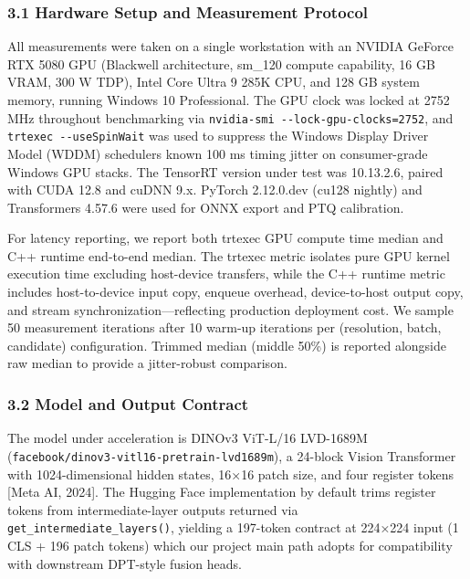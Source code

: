 \documentclass[
]{article}
\begin{document}
\subsubsection{3.1 Hardware Setup and Measurement
Protocol}\label{31-hardware-setup-and-measurement-protocol}

All measurements were taken on a single workstation with an NVIDIA
GeForce RTX 5080 GPU (Blackwell architecture, sm\_120 compute
capability, 16 GB VRAM, 300 W TDP), Intel Core Ultra 9 285K CPU, and 128
GB system memory, running Windows 10 Professional. The GPU clock was
locked at 2752 MHz throughout benchmarking via
\texttt{nvidia-smi\ -\/-lock-gpu-clocks=2752}, and
\texttt{trtexec\ -\/-useSpinWait} was used to suppress the Windows
Display Driver Model (WDDM) scheduler\textquotesingle s known 100 ms
timing jitter on consumer-grade Windows GPU stacks. The TensorRT version
under test was 10.13.2.6, paired with CUDA 12.8 and cuDNN 9.x. PyTorch
2.12.0.dev (cu128 nightly) and Transformers 4.57.6 were used for ONNX
export and PTQ calibration.

For latency reporting, we report both trtexec GPU compute time median
and C++ runtime end-to-end median. The trtexec metric isolates pure GPU
kernel execution time excluding host-device transfers, while the C++
runtime metric includes host-to-device input copy, enqueue overhead,
device-to-host output copy, and stream synchronization---reflecting
production deployment cost. We sample 50 measurement iterations after 10
warm-up iterations per (resolution, batch, candidate) configuration.
Trimmed median (middle 50\%) is reported alongside raw median to provide
a jitter-robust comparison.

\subsubsection{3.2 Model and Output
Contract}\label{32-model-and-output-contract}

The model under acceleration is DINOv3 ViT-L/16 LVD-1689M
(\texttt{facebook/dinov3-vitl16-pretrain-lvd1689m}), a 24-block Vision
Transformer with 1024-dimensional hidden states, 16×16 patch size, and
four register tokens {[}Meta AI, 2024{]}. The Hugging Face
implementation by default trims register tokens from intermediate-layer
outputs returned via \texttt{get\_intermediate\_layers()}, yielding a
197-token contract at 224×224 input (1 CLS + 196 patch tokens) which our
project main path adopts for compatibility with downstream DPT-style
fusion heads.
\end{document}
